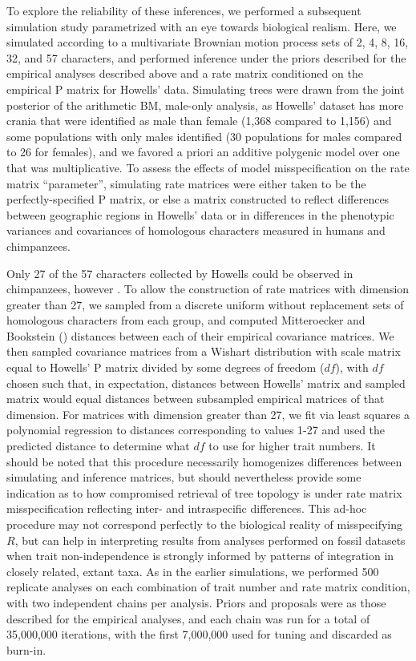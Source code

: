 To explore the reliability of these inferences, we performed a subsequent simulation study parametrized with an eye towards biological realism. Here, we simulated according to a multivariate Brownian motion process sets of 2, 4, 8, 16, 32, and 57 characters, and performed inference under the priors described for the empirical analyses described above and a rate matrix conditioned on the empirical P matrix for Howells’ data. Simulating trees were drawn from the joint posterior of the arithmetic BM, male-only analysis, as Howells’ dataset has more crania that were identified as male than female (1,368 compared to 1,156) and some populations with only males identified (30 populations for males compared to 26 for females), and we favored a priori an additive polygenic model over one that was multiplicative. To assess the effects of model misspecification on the rate matrix “parameter”, simulating rate matrices were either taken to be the perfectly-specified P matrix, or else a matrix constructed to reflect differences between geographic regions in Howells’ data \citep[as defined by][]{rosemanRandomGeneticDrift2016} or in differences in the phenotypic variances and covariances of homologous characters measured in humans and chimpanzees.

Only 27 of the 57 characters collected by Howells could be observed in chimpanzees, however \citep{weaverUnconstrainedCranialEvolution2015}. To allow the construction of rate matrices with dimension greater than 27, we sampled from a discrete uniform without replacement sets of homologous characters from each group, and computed Mitteroecker and Bookstein (\citeyear{mitteroeckerConceptualStatisticalRelationship2007}) distances between each of their empirical covariance matrices. We then sampled covariance matrices from a Wishart distribution with scale matrix equal to Howells’ P matrix divided by some degrees of freedom ($df$), with $df$ chosen such that, in expectation, distances between Howells’ matrix and sampled matrix would equal distances between subsampled empirical matrices of that dimension. For matrices with dimension greater than 27, we fit via least squares a polynomial regression to distances corresponding to values 1-27 and used the predicted distance to determine what $df$ to use for higher trait numbers. It should be noted that this procedure necessarily homogenizes differences between simulating and inference matrices, but should nevertheless provide some indication as to how compromised retrieval of tree topology is under rate matrix misspecification reflecting inter- and intraspecific differences. This ad-hoc procedure may not correspond perfectly to the biological reality of misspecifying $R$, but can help in interpreting results from analyses performed on fossil datasets when trait non-independence is strongly informed by patterns of integration in closely related, extant taxa. As in the earlier simulations, we performed 500 replicate analyses on each combination of trait number and rate matrix condition, with two independent chains per analysis. Priors and proposals were as those described for the empirical analyses, and each chain was run for a total of 35,000,000 iterations, with the first 7,000,000 used for tuning and discarded as burn-in.

